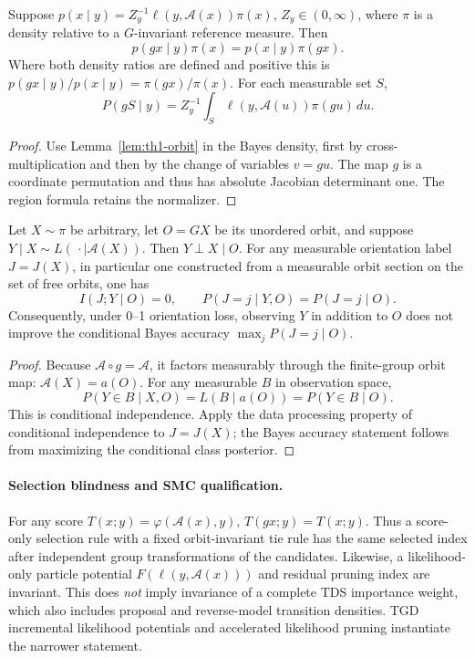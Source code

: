 \begin{proposition}
\label{prop:th1-prior-ratio}
Suppose \(p(x\mid y)=Z_y^{-1}\ell(y,\mathcal A(x))\pi(x)\),
\(Z_y\in(0,\infty)\), where \(\pi\) is a density relative to a
\(G\)-invariant reference measure. Then
\[
 p(gx\mid y)\pi(x)=p(x\mid y)\pi(gx).
\]
Where both density ratios are defined and positive this is
\(p(gx\mid y)/p(x\mid y)=\pi(gx)/\pi(x)\).
For each measurable set \(S\),
\[
 P(gS\mid y)=Z_y^{-1}
 \int_S\ell(y,\mathcal A(u))\pi(gu)\,du.
\]
\end{proposition}
\begin{proof}
Use Lemma~\ref{lem:th1-orbit} in the Bayes density, first by
cross-multiplication and then by the change of variables \(v=gu\).
The map \(g\) is a coordinate permutation and thus has absolute
Jacobian determinant one. The region formula retains the normalizer.
\end{proof}

\begin{proposition}
\label{prop:th1-conditional-information}
Let \(X\sim\pi\) be arbitrary, let \(O=G X\) be its unordered orbit,
and suppose \(Y\mid X\sim L(\,\cdot\mid\mathcal A(X))\).
Then \(Y\perp X\mid O\). For any measurable orientation label
\(J=J(X)\), in particular one constructed from a measurable orbit
section on the set of free orbits, one has
\[
 I(J;Y\mid O)=0,\qquad P(J=j\mid Y,O)=P(J=j\mid O).
\]
Consequently, under 0--1 orientation loss, observing \(Y\)
in addition to \(O\) does not improve the conditional Bayes accuracy
\(\max_j P(J=j\mid O)\).
\end{proposition}
\begin{proof}
Because \(\mathcal A\circ g=\mathcal A\), it factors measurably
through the finite-group orbit map: \(\mathcal A(X)=a(O)\).
For any measurable \(B\) in observation space,
\[
 P(Y\in B\mid X,O)=L(B\mid a(O))=P(Y\in B\mid O).
\]
This is conditional independence. Apply the data processing property
of conditional independence to \(J=J(X)\); the Bayes accuracy
statement follows from maximizing the conditional class posterior.
\end{proof}

\paragraph{Selection blindness and SMC qualification.}
For any score \(T(x;y)=\varphi(\mathcal A(x),y)\),
\(T(gx;y)=T(x;y)\). Thus a score-only selection rule
with a fixed orbit-invariant tie rule has the same selected
index after independent group transformations of the candidates.
Likewise, a likelihood-only particle potential \(F(\ell(y,\mathcal
A(x)))\) and residual pruning index are invariant.
This does \emph{not} imply invariance of a complete TDS importance
weight, which also includes proposal and reverse-model transition
densities. TGD incremental likelihood potentials and accelerated
likelihood pruning instantiate the narrower statement.

